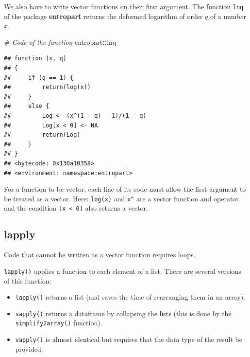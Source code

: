 \documentclass[
  12pt,
  american,
  a4paper,
  extrafontsizes,onecolumn,openright
  ]{memoir}
\newenvironment{Shaded}{\begin{snugshade}}{\end{snugshade}}
\newcommand{\CommentTok}[1]{\textcolor[rgb]{0.56,0.35,0.01}{\textit{#1}}}
\newcommand{\NormalTok}[1]{#1}
\newcommand{\SpecialCharTok}[1]{\textcolor[rgb]{0.81,0.36,0.00}{\textbf{#1}}}
\providecommand{\tightlist}{%
  \setlength{\itemsep}{0pt}\setlength{\parskip}{0pt}}
\begin{document}
\normalsize

We also have to write vector functions on their first argument.
The function \texttt{lnq} of the package \textbf{entropart} returns the deformed logarithm of order \(q\) of a number \(x\).

\scriptsize

\begin{Shaded}
\begin{Highlighting}[]
\CommentTok{\# Code of the function}
\NormalTok{entropart}\SpecialCharTok{::}\NormalTok{lnq}
\end{Highlighting}
\end{Shaded}

\begin{verbatim}
## function (x, q) 
## {
##     if (q == 1) {
##         return(log(x))
##     }
##     else {
##         Log <- (x^(1 - q) - 1)/(1 - q)
##         Log[x < 0] <- NA
##         return(Log)
##     }
## }
## <bytecode: 0x130a10358>
## <environment: namespace:entropart>
\end{verbatim}

\normalsize

For a function to be vector, each line of its code must allow the first argument to be treated as a vector.
Here: \texttt{log(x)} and \texttt{x\^{}} are a vector function and operator and the condition \texttt{{[}x\ \textless{}\ 0{]}} also returns a vector.

\subsection{lapply}\label{lapply}

Code that cannot be written as a vector function requires loops.

\texttt{lapply()} applies a function to each element of a list.
There are several versions of this function:

\begin{itemize}
\tightlist
\item
  \texttt{lapply()} returns a list (and saves the time of rearranging them in an array).
\item
  \texttt{sapply()} returns a dataframe by collapsing the lists (this is done by the \texttt{simplify2array()} function).
\item
  \texttt{vapply()} is almost identical but requires that the data type of the result be provided.
\end{itemize}

\scriptsize
\end{document}
